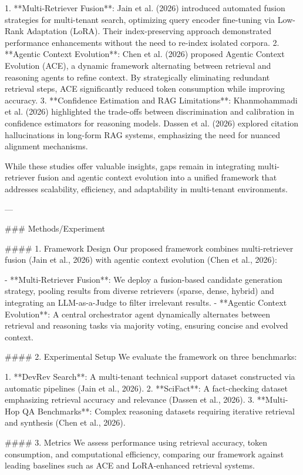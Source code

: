 1. **Multi-Retriever Fusion**: Jain et al. (2026) introduced automated fusion strategies for multi-tenant search, optimizing query encoder fine-tuning via Low-Rank Adaptation (LoRA). Their index-preserving approach demonstrated performance enhancements without the need to re-index isolated corpora.  
2. **Agentic Context Evolution**: Chen et al. (2026) proposed Agentic Context Evolution (ACE), a dynamic framework alternating between retrieval and reasoning agents to refine context. By strategically eliminating redundant retrieval steps, ACE significantly reduced token consumption while improving accuracy.  
3. **Confidence Estimation and RAG Limitations**: Khanmohammadi et al. (2026) highlighted the trade-offs between discrimination and calibration in confidence estimators for reasoning models. Dassen et al. (2026) explored citation hallucinations in long-form RAG systems, emphasizing the need for nuanced alignment mechanisms.  

While these studies offer valuable insights, gaps remain in integrating multi-retriever fusion and agentic context evolution into a unified framework that addresses scalability, efficiency, and adaptability in multi-tenant environments.

---

### Methods/Experiment  

#### 1. Framework Design  
Our proposed framework combines multi-retriever fusion (Jain et al., 2026) with agentic context evolution (Chen et al., 2026):

- **Multi-Retriever Fusion**: We deploy a fusion-based candidate generation strategy, pooling results from diverse retrievers (sparse, dense, hybrid) and integrating an LLM-as-a-Judge to filter irrelevant results.  
- **Agentic Context Evolution**: A central orchestrator agent dynamically alternates between retrieval and reasoning tasks via majority voting, ensuring concise and evolved context.

#### 2. Experimental Setup  
We evaluate the framework on three benchmarks:  

1. **DevRev Search**: A multi-tenant technical support dataset constructed via automatic pipelines (Jain et al., 2026).  
2. **SciFact**: A fact-checking dataset emphasizing retrieval accuracy and relevance (Dassen et al., 2026).  
3. **Multi-Hop QA Benchmarks**: Complex reasoning datasets requiring iterative retrieval and synthesis (Chen et al., 2026).  

#### 3. Metrics  
We assess performance using retrieval accuracy, token consumption, and computational efficiency, comparing our framework against leading baselines such as ACE and LoRA-enhanced retrieval systems.

